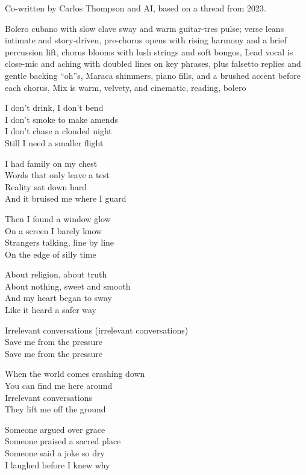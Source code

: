
\begin{notes}
Co-written by Carlos Thompson and AI, based on a thread from 2023.
\end{notes}
\begin{style}
Bolero cubano with slow clave sway and warm guitar-tres pulse; verse leans intimate and story-driven, pre-chorus opens with rising harmony and a brief percussion lift, chorus blooms with lush strings and soft bongos, Lead vocal is close-mic and aching with doubled lines on key phrases, plus falsetto replies and gentle backing “oh”s, Maraca shimmers, piano fills, and a brushed accent before each chorus, Mix is warm, velvety, and cinematic, reading, bolero
\end{style}
\begin{lyrics}
I don’t drink, I don’t bend\\
I don’t smoke to make amends\\
I don’t chase a clouded night\\
Still I need a smaller flight

I had family on my chest\\
Words that only leave a test\\
Reality sat down hard\\
And it bruised me where I guard

Then I found a window glow\\
On a screen I barely know\\
Strangers talking, line by line\\
On the edge of silly time

About religion, about truth\\
About nothing, sweet and smooth\\
And my heart began to sway\\
Like it heard a safer way

Irrelevant conversations
(irrelevant conversations)\\
Save me from the pressure\\
Save me from the pressure

When the world comes crashing down\\
You can find me here around\\
Irrelevant conversations\\
They lift me off the ground

Someone argued over grace\\
Someone praised a sacred place\\
Someone said a joke so dry\\
I laughed before I knew why


\end{lyrics}

